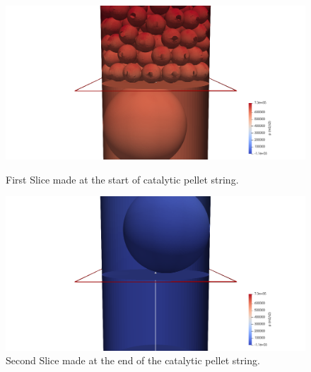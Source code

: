 \begin{figure}
	\includegraphics[width=\linewidth]{Figures/visualisation/caseA/slice1_CaseA.png}
	\caption{First Slice made at the start of catalytic pellet string.}
	\label{fig:Slice1_CaseA}
	
	\includegraphics[width=\linewidth]{Figures/visualisation/caseA/slice2_CaseA.png}
	\caption{Second Slice made at the end of the catalytic pellet string.}
	\label{fig:Slice2_CaseA}
\end{figure}
